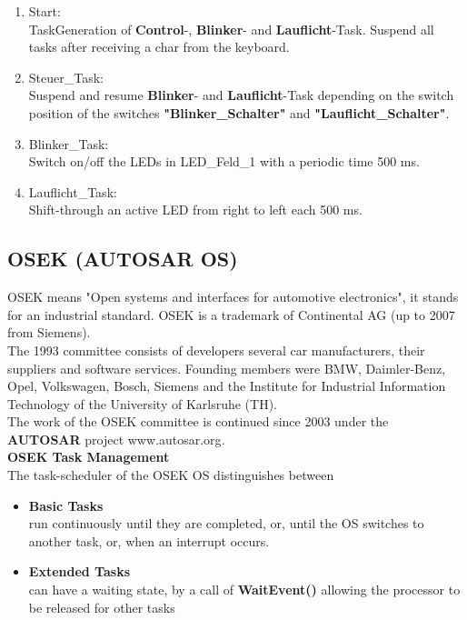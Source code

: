 \begin{enumerate}
\item  Start:\\TaskGeneration of \textbf{Control}-, \textbf{Blinker}- and \textbf{Lauflicht}-Task. Suspend all tasks after receiving a char from the keyboard.

\item  Steuer\_Task:\\Suspend and resume \textbf{Blinker}- and \textbf{Lauflicht}-Task depending on the switch position of the switches \textbf{"Blinker\_Schalter"} and \textbf{"Lauflicht\_Schalter"}.

\item  Blinker\_Task:\\Switch on/off the LEDs in LED\_Feld\_1 with a periodic time 500 ms.

\item  Lauflicht\_Task:\\Shift-through an active LED from right to left each 500 ms.
\end{enumerate}

\subsection{OSEK (AUTOSAR OS)}

OSEK means "Open systems and interfaces for automotive electronics", it stands for an industrial standard. OSEK is a trademark of Continental AG (up to 2007 from Siemens).\\

The 1993 committee consists of developers several car manufacturers, their suppliers and software services. Founding members were BMW, Daimler-Benz, Opel, Volkswagen, Bosch, Siemens and the Institute for Industrial Information Technology of the University of Karlsruhe (TH). \\

The work of the OSEK committee is continued since 2003 under the \textbf{AUTOSAR} project www.autosar.org\textit{.}\\

{\rot\bf OSEK Task Management}\\

The task-scheduler of the OSEK OS distinguishes between

\begin{itemize}
\item  \textbf{Basic Tasks}\\run continuously until they are completed, or, until the OS switches to another task, or, when an interrupt occurs.

\item  \textbf{Extended Tasks}\\can have a waiting state, by a call of \textbf{WaitEvent()} allowing the processor to be released for other tasks
\end{itemize}
    
